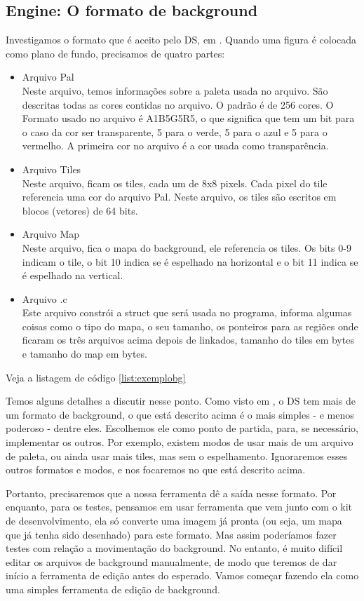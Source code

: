 \documentclass[brazil]{abnt}
\begin{document}
\subsection{Engine: O formato de background}

Investigamos o formato que é aceito pelo DS, em \cite{DSSpec}. Quando uma figura é colocada como plano de fundo, precisamos de quatro partes:

\begin{itemize}
 \item Arquivo Pal\\
 Neste arquivo, temos informações sobre a paleta usada no arquivo. São descritas todas as cores contidas no arquivo. O padrão é de 256 cores. O Formato usado no arquivo é A1B5G5R5, o que significa que tem um bit para o caso da cor ser transparente, 5 para o verde, 5 para o azul e 5 para o vermelho. A primeira cor no arquivo é a cor usada como transparência.
 \item Arquivo Tiles\\
 Neste arquivo, ficam os tiles, cada um de 8x8 pixels. Cada pixel do tile referencia uma cor do arquivo Pal. Neste arquivo, os tiles são escritos em blocos (vetores) de 64 bits. 
 \item Arquivo Map\\
 Neste arquivo, fica o mapa do background, ele referencia os tiles. Os bits 0-9 indicam o tile, o bit 10 indica se é espelhado na horizontal e o bit 11 indica se é espelhado na vertical.
 \item Arquivo .c\\
 Este arquivo constrói a struct que será usada no programa, informa algumas coisas como o tipo do mapa, o seu tamanho, os ponteiros para as regiões onde ficaram os três arquivos acima depois de linkados, tamanho do tiles em bytes e tamanho do map em bytes. 
\end{itemize}

Veja a listagem de código \ref{list:exemplobg}

Temos alguns detalhes a discutir nesse ponto. Como visto em \cite{DSSpec}, o DS tem mais de um formato de background, o que está descrito acima é o mais simples - e menos poderoso - dentre eles. Escolhemos ele como ponto de partida, para, se necessário, implementar os outros. Por exemplo, existem modos de usar mais de um arquivo de paleta, ou ainda usar mais tiles, mas sem o espelhamento. Ignoraremos esses outros formatos e modos, e nos focaremos no que está descrito acima.

Portanto, precisaremos que a nossa ferramenta dê a saída nesse formato. Por enquanto, para os testes, pensamos em usar ferramenta que vem junto com o kit de desenvolvimento, ela só converte uma imagem já pronta (ou seja, um mapa que já tenha sido desenhado) para este formato. Mas assim poderíamos fazer testes com relação a movimentação do background. No entanto, é muito difícil editar os arquivos de background manualmente, de modo que teremos de dar início a ferramenta de edição antes do esperado. Vamos começar fazendo ela como uma simples ferramenta de edição de background.
\end{document}
